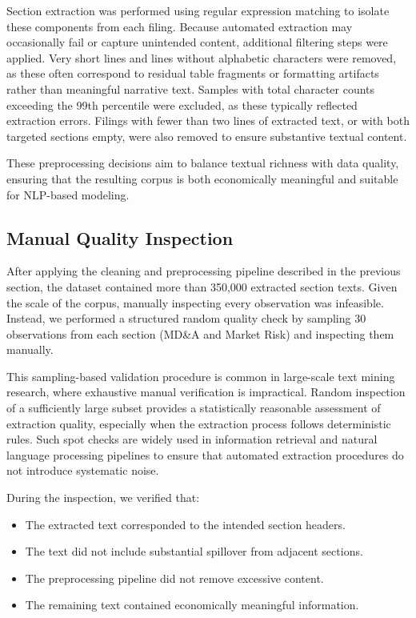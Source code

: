Section extraction was performed using regular expression matching to isolate these components from each filing. 
Because automated extraction may occasionally fail or capture unintended content, additional filtering steps were applied. 
Very short lines and lines without alphabetic characters were removed, as these often correspond to residual table fragments or formatting artifacts rather than meaningful narrative text. 
Samples with total character counts exceeding the 99th percentile were excluded, as these typically reflected extraction errors. 
Filings with fewer than two lines of extracted text, or with both targeted sections empty, were also removed to ensure substantive textual content.

These preprocessing decisions aim to balance textual richness with data quality, ensuring that the resulting corpus is both economically meaningful and suitable for NLP-based modeling.

\subsection{Manual Quality Inspection}

After applying the cleaning and preprocessing pipeline described in the previous section, the dataset contained more than 350,000 extracted section texts. Given the scale of the corpus, manually inspecting every observation was infeasible. Instead, we performed a structured random quality check by sampling 30 observations from each section (MD\&A and Market Risk) and inspecting them manually.

This sampling-based validation procedure is common in large-scale text mining research, where exhaustive manual verification is impractical. Random inspection of a sufficiently large subset provides a statistically reasonable assessment of extraction quality, especially when the extraction process follows deterministic rules. Such spot checks are widely used in information retrieval and natural language processing pipelines to ensure that automated extraction procedures do not introduce systematic noise.

During the inspection, we verified that:
\begin{itemize}
    \item The extracted text corresponded to the intended section headers.
    \item The text did not include substantial spillover from adjacent sections.
    \item The preprocessing pipeline did not remove excessive content.
    \item The remaining text contained economically meaningful information.
\end{itemize}

